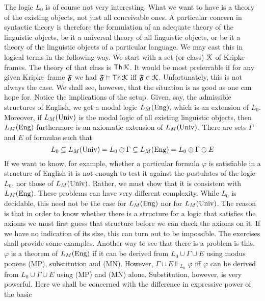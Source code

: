 The logic $L_0$ is of course not very interesting. What we want to
have is a theory of the existing objects, not just all conceivable
ones. A particular concern in syntactic theory is therefore the
formulation of an adequate theory of the linguistic objects, be
it a universal theory of all linguistic objects, or be it a theory of
the linguistic objects of a particular language. We may cast this
in logical terms in the following way. We start with a set (or
class) $\mathcal{K}$ of Kripke--frames. The theory of that class is
$\mathsf{Th}\, \mathcal{K}$. It would be most preferrable if for any
given Kripke--frame  $\mathfrak{F}$ we had $\mathfrak{F} \vDash \mathsf{Th}\, \mathcal{K}$
iff $\mathfrak{F} \in \mathcal{K}$. Unfortunately, this is not always
the case. We shall see, however, that the situation is as good as
one can hope for. Notice the implications of the setup. Given,
say, the admissible structures of English, we get a modal logic
$L_M(\mbox{\rm Eng})$, which is an extension of $L_0$. Moreover,
if $L_M(\mbox{\rm Univ})$ is the modal logic of all existing
linguistic objects, then $L_M(\mbox{\rm Eng})$ furthermore is an
axiomatic extension of $L_M(\mbox{\rm Univ})$. There are sets
$\Gamma$ and $E$ of formulae such that
\begin{equation}
L_0 \subseteq L_M(\mbox{\rm Univ}) = L_0 \oplus \Gamma
\subseteq L_M(\mbox{\rm Eng}) = L_0 \oplus \Gamma \oplus E
\end{equation}
If we want to know, for example, whether a particular formula
$\varphi$ is satisfiable in a structure of English it is not
enough to test it against the postulates of the logic $L_0$, nor
those of $L_M(\mbox{\rm Univ})$. Rather, we must show that it
is consistent with $L_M(\mbox{\rm Eng})$. These problems can have
very different complexity. While $L_0$ is decidable, this need not
be the case for $L_M(\mbox{\rm Eng})$ nor for $L_M(\mbox{\rm
Univ})$. The reason is that in order to know whether there is a
structure for a logic that satisfies the axioms we must first
guess that structure before we can check the axioms on it. If we
have no indication of its size, this can turn out to be
impossible. The exercises shall provide some examples. Another way
to see that there is a problem is this. $\varphi$ is a theorem of
$L_M(\mbox{\rm Eng})$ if it can be derived from $L_0 \cup \Gamma
\cup E$ using modus ponens (MP), substitution and (MN). However,
$\Gamma \cup E \Vdash_{L_0} \varphi$ iff $\varphi$ can
be derived from $L_0 \cup\Gamma \cup E$ using (MP) and (MN) alone.
Substitution, however, is very powerful. Here we shall be
concerned with the difference in expressive power of the basic
